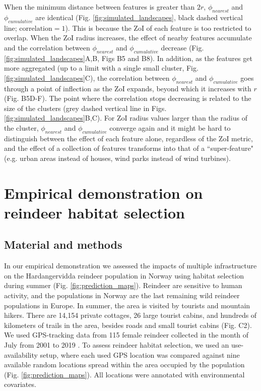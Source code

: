 \documentclass[titlepage]{article}
\begin{document}
When the minimum distance between features is greater than $2r$, $\phi_{nearest}$ and $\phi_{cumulative}$ are identical (Fig. \ref{fig:simulated_landscapes}, black dashed vertical line; $\text{correlation} = 1$). This is because the ZoI of each feature is too restricted to overlap. When the ZoI radius increases, the effect of nearby features accumulate and the correlation between $\phi_{nearest}$ and $\phi_{cumulative}$ decrease (Fig. \ref{fig:simulated_landscapes}A,B, Figs B5 and B8). In addition, as the features get more aggregated (up to a limit with a single small cluster, Fig. \ref{fig:simulated_landscapes}C), the correlation between $\phi_{nearest}$ and $\phi_{cumulative}$ goes through a point of inflection as the ZoI expands, beyond which it increases with $r$ (Fig. B5D-F). The point where the correlation stops decreasing is related to the size of the clusters (grey dashed vertical line in Figs. \ref{fig:simulated_landscapes}B,C). For ZoI radius values larger than the radius of the cluster, $\phi_{nearest}$ and $\phi_{cumulative}$ converge again 
and it might be hard to distinguish between the effect of each feature alone, regardless of the ZoI metric, and the effect of a collection of features transforms into that of a ``super-feature" (e.g. urban areas instead of houses, wind parks instead of wind turbines). 

\section{Empirical demonstration on reindeer habitat selection}

\subsection{Material and methods}

In our empirical demonstration we assessed the impacts of multiple infrastructure on the Hardangervidda reindeer population in Norway using habitat selection during summer (Fig. \ref{fig:prediction_maps}). Reindeer are sensitive to human activity, and the populations in Norway are the last remaining wild reindeer populations in Europe. In summer, the area is visited by tourists and mountain hikers. There are 14,154 private cottages, 26 large tourist cabins, and hundreds of kilometers of trails in the area, besides roads and small tourist cabins (Fig. C2). We used GPS-tracking data from 115 female reindeer collected in the month of July from 2001 to 2019 \citep[see][for further details]{panzacchi_searching_2015}. To assess reindeer habitat selection, we used an use-availability setup, where each used GPS location was compared against nine available random locations spread within the area occupied by the population (Fig. \ref{fig:prediction_maps}). All locations were annotated with environmental covariates.
\end{document}

